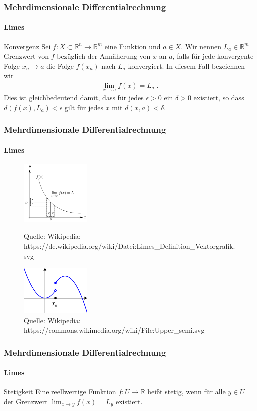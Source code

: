 \documentclass{beamer}
\begin{document}
\begin{frame}
    \frametitle{Mehrdimensionale Differentialrechnung}
\framesubtitle{Limes}
    \begin{block}{Konvergenz}
Sei $f :X \subset \mathbb{R}^n \to \mathbb{R}^m$ eine  Funktion und $a \in X$. Wir nennen $L_a \in \mathbb{R}^m$ Grenzwert von $f$ bezüglich der Annäherung von $x$ an $a$, falls für jede  konvergente Folge $x_n \to a$  die Folge $f(x_n)$ nach $L_a$ konvergiert.  In diesem Fall bezeichnen wir
\begin{align*}
\lim_{x \to a} f(x) = L_a \;.
\end{align*}
Dies ist gleichbedeutend damit, dass für jedes $\epsilon > 0$ ein $\delta > 0$ existiert, so dass
$d(f(x) ,L_a) < \epsilon$ gilt für jedes $x$ mit $d(x, a) < \delta$.
\end{block}


 \end{frame}


\begin{frame}
    \frametitle{Mehrdimensionale Differentialrechnung}
\framesubtitle{Limes}

\begin{figure}[H]
      \centering
    \includegraphics[width=0.3\textwidth]{images/500px-Limes_Definition_Vektorgrafik}
      \caption{Quelle: Wikipedia: https://de.wikipedia.org/wiki/Datei:Limes\_Definition\_Vektorgrafik.svg}
    \includegraphics[width=0.3\textwidth]{images/500px-Upper_semi}
      \caption{Quelle: Wikipedia: https://commons.wikimedia.org/wiki/File:Upper\_semi.svg}
\end{figure}

 \end{frame}



\begin{frame}
    \frametitle{Mehrdimensionale Differentialrechnung}
\framesubtitle{Limes}
    \begin{block}{Stetigkeit}
Eine reellwertige Funktion $f :U \to \mathbb{R}$ heißt stetig, wenn für alle $y \in U$ der Grenzwert $\lim_{x \to y} f(x) = L_{y} $ existiert.

\end{block}


 \end{frame}
\end{document}
